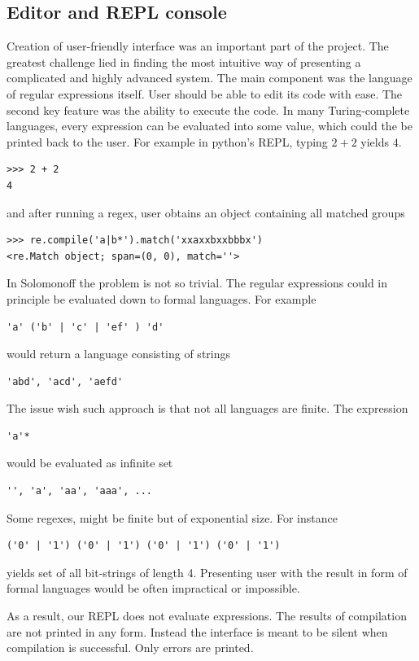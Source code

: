 
\subsection{Editor and REPL console}

Creation of user-friendly interface was an important part of the project.
The greatest challenge lied in finding the most intuitive way of presenting a complicated and highly advanced system. The main component was the language of regular expressions itself. User should be able to edit its code with ease. The second key feature was the ability to execute the code. 
In many Turing-complete languages, every expression can be evaluated into some value, which could the be printed back to the user. For example in python's REPL, typing $2+2$ yields $4$.
\begin{lstlisting}
>>> 2 + 2
4
\end{lstlisting}
and after running a regex, user obtains an object containing all matched groups
\begin{lstlisting}
>>> re.compile('a|b*').match('xxaxxbxxbbbx')
<re.Match object; span=(0, 0), match=''>
\end{lstlisting}
In Solomonoff the problem is not so trivial. The regular expressions could in principle be evaluated down to formal languages. For example 
\begin{lstlisting}
'a' ('b' | 'c' | 'ef' ) 'd'
\end{lstlisting}
would return a language consisting of strings
\begin{lstlisting}
'abd', 'acd', 'aefd'
\end{lstlisting}
The issue wish such approach is that not all languages are finite. The expression
\begin{lstlisting}
'a'*
\end{lstlisting}
would be evaluated as infinite set
\begin{lstlisting}
'', 'a', 'aa', 'aaa', ...
\end{lstlisting}
Some regexes, might be finite but of exponential size. For instance
\begin{lstlisting}
('0' | '1') ('0' | '1') ('0' | '1') ('0' | '1')
\end{lstlisting}
yields set of all bit-strings of length 4. Presenting user with the result in form of formal languages would be often impractical or impossible. 

As a result, our REPL does not evaluate expressions. The results of compilation are not printed in any form. Instead the interface is meant to be silent when compilation is successful. Only errors are printed. 

